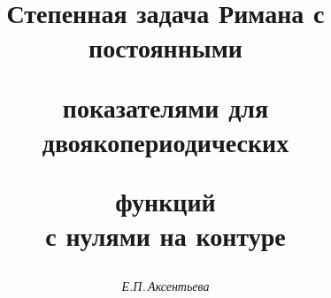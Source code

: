 




% 





\newcommand{\im}{\operatorname{Im}}


\newcommand{\re}{\operatorname{Re}}


\newcommand{\Int}{\operatorname{int}}


\newcommand{\Ind}{\operatorname{ind}}


\newcommand{\arctg}{\operatorname{arctg}}


\newcommand{\tts}[1]{}







\setcounter{page}{3}















\author{\it Е.П.\,Аксентьева }




\title{Степенная задача Римана с постоянными


показателями для двоякопериодических


функций\\ с нулями на контуре}





\date{}




\pagestyle{plain} %





